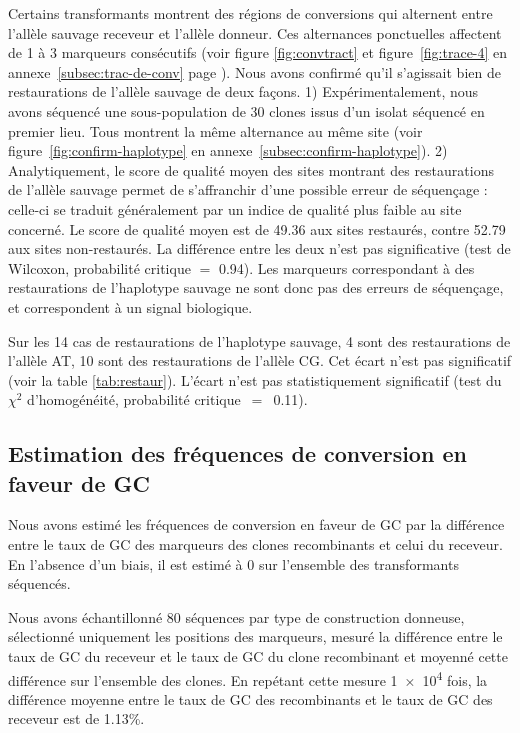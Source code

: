 Certains transformants montrent des régions de conversions qui alternent entre
l'allèle sauvage receveur et l'allèle donneur. Ces alternances ponctuelles
affectent de 1 à 3 marqueurs consécutifs (voir figure \ref{fig:convtract} et
figure~\ref{fig:trace-4} en annexe~\ref{subsec:trac-de-conv}
page \pageref{fig:trace-4}). Nous avons confirmé qu'il s'agissait bien de
restaurations de l'allèle sauvage de deux façons. 1) Expérimentalement, nous
avons séquencé une sous-population de 30 clones issus d'un isolat séquencé en
premier lieu. Tous montrent la même alternance au même site (voir
figure~\ref{fig:confirm-haplotype} en annexe~\ref{subsec:confirm-haplotype}). 2)
Analytiquement, le score de qualité moyen des sites montrant des restaurations
de l'allèle sauvage permet de s'affranchir d'une possible erreur de séquençage :
celle-ci se traduit généralement par un indice de qualité plus faible au site
concerné. Le score de qualité moyen est de \num{49.36} aux sites restaurés,
contre \num{52.79} aux sites non-restaurés. La différence entre les deux n'est
pas significative (test de Wilcoxon, probabilité critique \(=\) \num{0.94}). Les
marqueurs correspondant à des restaurations de l'haplotype sauvage ne sont donc
pas des erreurs de séquençage, et correspondent à un signal biologique.

Sur les 14 cas de restaurations de l'haplotype sauvage, \num{4} sont des
restaurations de l'allèle AT, \num{10} sont des restaurations de l'allèle CG.
Cet écart n'est pas significatif (voir la table \ref{tab:restaur}). L'écart
n'est pas statistiquement significatif (test du \(\chi^2\) d'homogénéité,
probabilité critique~\(=\)~\num{0.11}).


\subsection{Estimation des fréquences de conversion en faveur de GC}
\label{subsec:result-freq}

Nous avons estimé les fréquences de conversion en faveur de GC par la différence
entre le taux de GC des marqueurs des clones recombinants et celui du receveur.
En l'absence d'un biais, il est estimé à 0 sur l'ensemble des transformants
séquencés.

Nous avons échantillonné 80 séquences par type de construction donneuse,
sélectionné uniquement les positions des marqueurs, mesuré la différence entre
le taux de GC du receveur et le taux de GC du clone recombinant et moyenné cette
différence sur l'ensemble des clones. En repétant cette mesure \num{1e4} fois, la
différence moyenne entre le taux de GC des recombinants et le taux de GC des
receveur est de \num{1.13}\si{\percent}.
